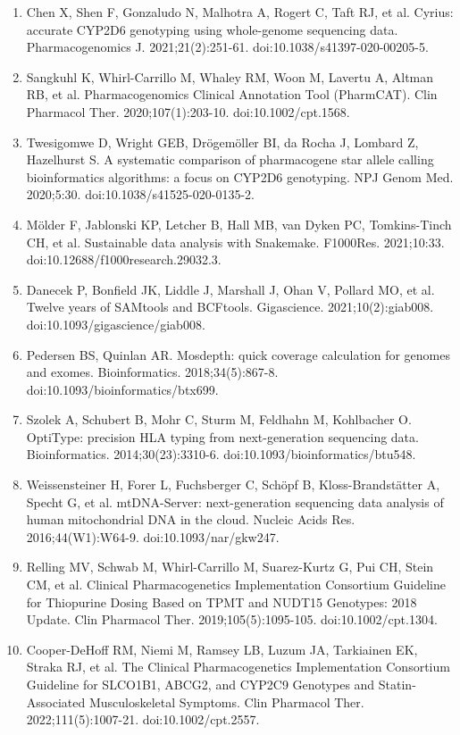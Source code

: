 \documentclass[11pt]{article}
\begin{document}
\begin{enumerate}
\item Chen X, Shen F, Gonzaludo N, Malhotra A, Rogert C, Taft RJ, et al. Cyrius: accurate CYP2D6 genotyping using whole-genome sequencing data. Pharmacogenomics J. 2021;21(2):251-61. doi:10.1038/s41397-020-00205-5.
\item Sangkuhl K, Whirl-Carrillo M, Whaley RM, Woon M, Lavertu A, Altman RB, et al. Pharmacogenomics Clinical Annotation Tool (PharmCAT). Clin Pharmacol Ther. 2020;107(1):203-10. doi:10.1002/cpt.1568.
\item Twesigomwe D, Wright GEB, Drögemöller BI, da Rocha J, Lombard Z, Hazelhurst S. A systematic comparison of pharmacogene star allele calling bioinformatics algorithms: a focus on CYP2D6 genotyping. NPJ Genom Med. 2020;5:30. doi:10.1038/s41525-020-0135-2.
\item Mölder F, Jablonski KP, Letcher B, Hall MB, van Dyken PC, Tomkins-Tinch CH, et al. Sustainable data analysis with Snakemake. F1000Res. 2021;10:33. doi:10.12688/f1000research.29032.3.
\item Danecek P, Bonfield JK, Liddle J, Marshall J, Ohan V, Pollard MO, et al. Twelve years of SAMtools and BCFtools. Gigascience. 2021;10(2):giab008. doi:10.1093/gigascience/giab008.
\item Pedersen BS, Quinlan AR. Mosdepth: quick coverage calculation for genomes and exomes. Bioinformatics. 2018;34(5):867-8. doi:10.1093/bioinformatics/btx699.
\item Szolek A, Schubert B, Mohr C, Sturm M, Feldhahn M, Kohlbacher O. OptiType: precision HLA typing from next-generation sequencing data. Bioinformatics. 2014;30(23):3310-6. doi:10.1093/bioinformatics/btu548.
\item Weissensteiner H, Forer L, Fuchsberger C, Schöpf B, Kloss-Brandstätter A, Specht G, et al. mtDNA-Server: next-generation sequencing data analysis of human mitochondrial DNA in the cloud. Nucleic Acids Res. 2016;44(W1):W64-9. doi:10.1093/nar/gkw247.
\item Relling MV, Schwab M, Whirl-Carrillo M, Suarez-Kurtz G, Pui CH, Stein CM, et al. Clinical Pharmacogenetics Implementation Consortium Guideline for Thiopurine Dosing Based on TPMT and NUDT15 Genotypes: 2018 Update. Clin Pharmacol Ther. 2019;105(5):1095-105. doi:10.1002/cpt.1304.
\item Cooper-DeHoff RM, Niemi M, Ramsey LB, Luzum JA, Tarkiainen EK, Straka RJ, et al. The Clinical Pharmacogenetics Implementation Consortium Guideline for SLCO1B1, ABCG2, and CYP2C9 Genotypes and Statin-Associated Musculoskeletal Symptoms. Clin Pharmacol Ther. 2022;111(5):1007-21. doi:10.1002/cpt.2557.

\end{enumerate}
\end{document}
